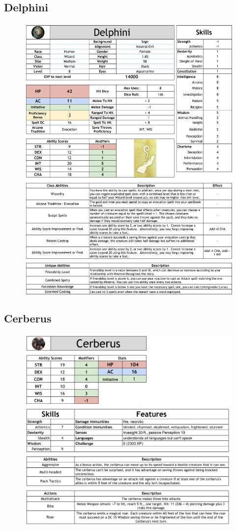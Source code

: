 \subsection{Delphini}
\begin{figure}[H]
\includegraphics[max width=\textwidth]{../Pictures/Characters/Stat_sheets/Delphini_sheet.png}
\end{figure}

\subsection{Cerberus}
\begin{figure}[H]
\includegraphics[max width=\textwidth]{../Pictures/Characters/Stat_sheets/Cerberus_sheet.png}
\end{figure}
